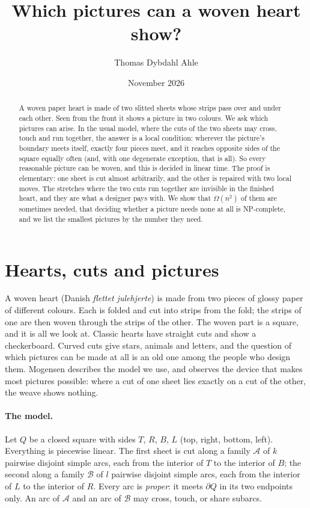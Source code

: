 \documentclass[11pt,a4paper]{article}
\title{Which pictures can a woven heart show?}
\author{Thomas Dybdahl Ahle}
\date{November 2026}
\theoremstyle{definition}
\theoremstyle{remark}
\newcommand{\A}{\mathcal{A}}
\newcommand{\B}{\mathcal{B}}
\newcommand{\bd}{\partial}
\begin{document}
\maketitle
\begin{abstract}
A woven paper heart is made of two slitted sheets whose strips pass over and
under each other. Seen from the front it shows a picture in two colours.
We ask which pictures can arise. In the usual model, where the cuts of the
two sheets may cross, touch and run together, the answer is a local
condition: wherever the picture's boundary meets itself, exactly four pieces
meet, and it reaches opposite sides of the square equally often (and, with
one degenerate exception, that is all). So every reasonable picture can be
woven, and this is decided in linear time. The
proof is elementary: one sheet is cut almost arbitrarily, and the other is
repaired with two local moves. The stretches where the two cuts run together
are invisible in the finished heart, and they are what a designer pays
with. We show that $\Omega(n^2)$ of them are sometimes needed, that deciding
whether a picture needs none at all is NP-complete, and we list the
smallest pictures by the number they need.
\end{abstract}

\section{Hearts, cuts and pictures}

A woven heart (Danish \emph{flettet julehjerte}) is made from two pieces of
glossy paper of different colours. Each is folded and cut into strips from
the fold; the strips of one are then woven through the strips of the other.
The woven part is a square, and it is all we look at. Classic hearts have
straight cuts and show a checkerboard. Curved cuts give stars, animals and
letters, and the question of which pictures can be made at all is an old one
among the people who design them. Mogensen \cite{mogensen} describes the
model we use, and observes the device that makes most pictures possible:
where a cut of one sheet lies exactly on a cut of the other, the weave shows
nothing.

\paragraph{The model.}
Let $Q$ be a closed square with sides $T$, $R$, $B$, $L$ (top, right,
bottom, left). Everything is piecewise linear. The first sheet is cut along
a family $\A$ of $k$ pairwise disjoint simple arcs, each from the interior
of $T$ to the interior of $B$; the second along a family $\B$ of $l$
pairwise disjoint simple arcs, each from the interior of $L$ to the
interior of $R$. Every arc is \emph{proper}: it meets $\bd Q$ in its two
endpoints only. An arc of $\A$ and an arc of $\B$ may cross, touch, or
share subarcs.
\end{document}
